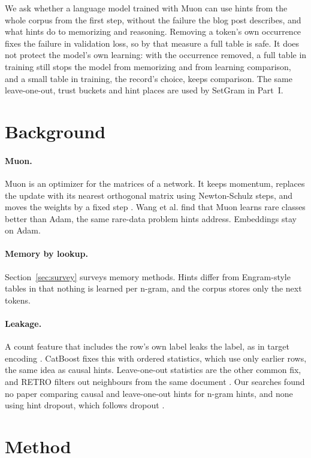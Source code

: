 \documentclass[11pt]{article}
\begin{document}
We ask whether a language model trained with Muon can use hints from the whole corpus from the first step, without the failure the blog post describes, and what hints do to memorizing and reasoning. Removing a token's own occurrence fixes the failure in validation loss, so by that measure a full table is safe. It does not protect the model's own learning: with the occurrence removed, a full table in training still stops the model from memorizing and from learning comparison, and a small table in training, the record's choice, keeps comparison. The same leave-one-out, trust buckets and hint places are used by SetGram in Part~I.

\section{Background}
\paragraph{Muon.} Muon \cite{muon} is an optimizer for the matrices of a network. It keeps momentum, replaces the update with its nearest orthogonal matrix using Newton-Schulz steps, and moves the weights by a fixed step \cite{muonkimi}. Wang et al. \cite{wang} find that Muon learns rare classes better than Adam, the same rare-data problem hints address. Embeddings stay on Adam.

\paragraph{Memory by lookup.} Section~\ref{sec:survey} surveys memory methods. Hints differ from Engram-style tables in that nothing is learned per n-gram, and the corpus stores only the next tokens.

\paragraph{Leakage.} A count feature that includes the row's own label leaks the label, as in target encoding \cite{micci}. CatBoost \cite{catboost} fixes this with ordered statistics, which use only earlier rows, the same idea as causal hints. Leave-one-out statistics are the other common fix, and RETRO filters out neighbours from the same document \cite{retro}. Our searches found no paper comparing causal and leave-one-out hints for n-gram hints, and none using hint dropout, which follows dropout \cite{dropout}.

\section{Method}
\end{document}
